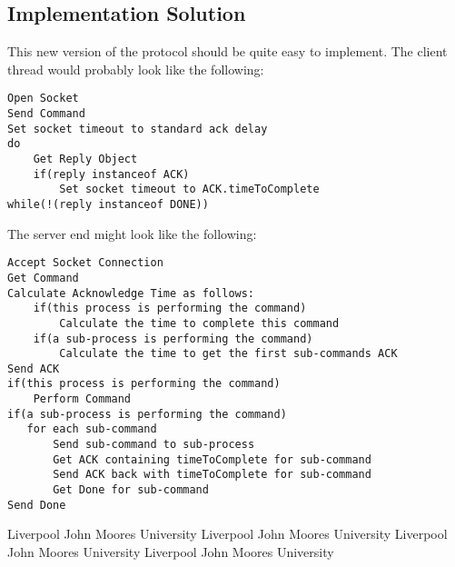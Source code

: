 \documentclass[10pt,a4paper]{article}
\begin{document}
\subsection{Implementation Solution}
This new version of the protocol should be quite easy to implement. The client thread would probably look like
the following:
\begin{verbatim}
Open Socket
Send Command
Set socket timeout to standard ack delay
do
    Get Reply Object
    if(reply instanceof ACK)
        Set socket timeout to ACK.timeToComplete
while(!(reply instanceof DONE))
\end{verbatim}

The server end might look like the following:
\begin{verbatim}
Accept Socket Connection
Get Command
Calculate Acknowledge Time as follows:
    if(this process is performing the command) 
        Calculate the time to complete this command
    if(a sub-process is performing the command)
        Calculate the time to get the first sub-commands ACK
Send ACK
if(this process is performing the command)
    Perform Command
if(a sub-process is performing the command)
   for each sub-command
       Send sub-command to sub-process
       Get ACK containing timeToComplete for sub-command
       Send ACK back with timeToComplete for sub-command
       Get Done for sub-command
Send Done
\end{verbatim}


\begin{thebibliography}{99}
Liverpool John Moores University
Liverpool John Moores University 
Liverpool John Moores University 
Liverpool John Moores University 
\end{thebibliography}
\end{document}
